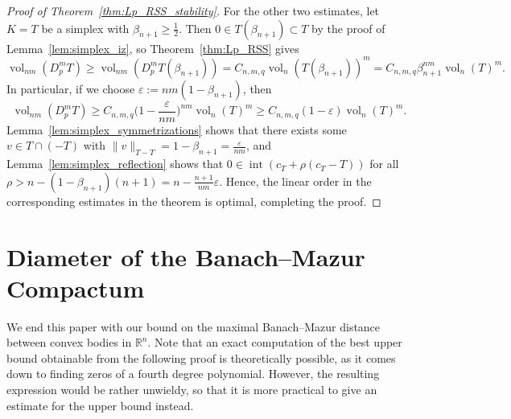 \documentclass{amsart}
\newcommand\R{\mathbb{R}}
\DeclareMathOperator{\inte}{int}
\DeclareMathOperator{\vol}{vol}
\newcommand{\diff}[3]{D_{#1}^{#2} #3}
\newcommand{\simplexscale}[2]{#1(#2)}
\begin{document}
\begin{proof}[Proof of Theorem~\ref{thm:Lp_RSS_stability}]
For the other two estimates, let $K = T$ be a simplex with $\beta_{n+1} \geq \frac{1}{2}$.
Then $0 \in \simplexscale{T}{\beta_{n+1}} \subset T$ by the proof of Lemma~\ref{lem:simplex_iz}, so Theorem~\ref{thm:Lp_RSS} gives
\[
    \vol_{nm}(\diff{p}{m}{T})
    \geq \vol_{nm}(\diff{p}{m}{\simplexscale{T}{\beta_{n+1}}})
    = C_{n,m,q} \vol_n(\simplexscale{T}{\beta_{n+1}})^m
    = C_{n,m,q} \beta_{n+1}^{nm} \vol_n(T)^m.
\]
In particular, if we choose $\varepsilon := nm (1-\beta_{n+1})$, then
\[
    \vol_{nm}(\diff{p}{m}{T})
    \geq C_{n,m,q} \bigg( 1 - \frac{\varepsilon}{nm} \bigg)^{nm} \vol_n(T)^m
    \geq C_{n,m,q} (1-\varepsilon) \vol_n(T)^m.
\]
Lemma~\ref{lem:simplex_symmetrizations} shows that there exists some $v \in T \cap (-T)$ with $\|v\|_{T-T} = 1 - \beta_{n+1} = \frac{\varepsilon}{nm}$, and Lemma~\ref{lem:simplex_reflection} shows that $0 \in \inte( c_T + \rho (c_T - T))$ for all $\rho > n - (1-\beta_{n+1})(n+1) = n - \frac{n+1}{nm} \varepsilon$.
Hence, the linear order in the corresponding estimates in the theorem is optimal, completing the proof.
\end{proof}



\section{Diameter of the Banach\texorpdfstring{--}{-}Mazur Compactum}\label{sec:DiameterBMcompactum}



We end this paper with our bound on the maximal Banach--Mazur distance between convex bodies in $\R^n$.
Note that an exact computation of the best upper bound obtainable from the following proof is theoretically possible, as it comes down to finding zeros of a fourth degree polynomial.
However, the resulting expression would be rather unwieldy, so that it is more practical to give an estimate for the upper bound instead.
\end{document}
